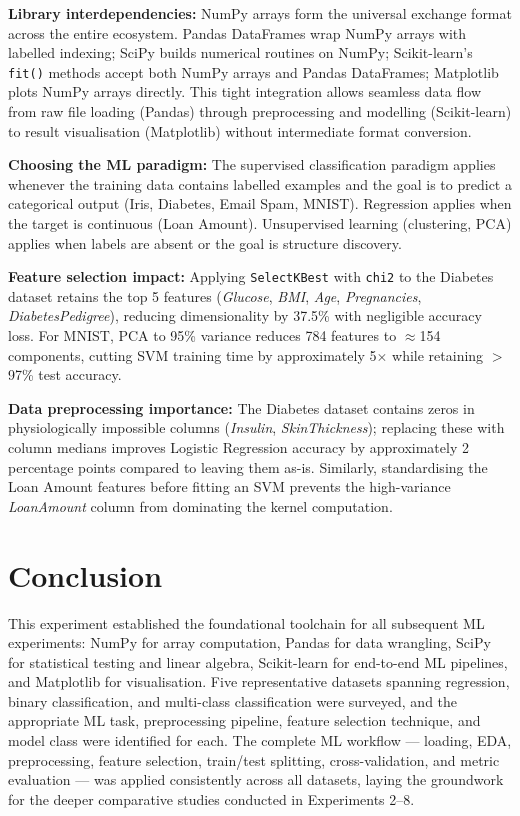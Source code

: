 \documentclass[12pt,a4paper]{article}
\begin{document}
\textbf{Library interdependencies:}
NumPy arrays form the universal exchange format across the entire ecosystem.
Pandas DataFrames wrap NumPy arrays with labelled indexing; SciPy builds numerical routines
on NumPy; Scikit-learn's \texttt{fit()} methods accept both NumPy arrays and Pandas DataFrames;
Matplotlib plots NumPy arrays directly. This tight integration allows seamless data flow
from raw file loading (Pandas) through preprocessing and modelling (Scikit-learn) to
result visualisation (Matplotlib) without intermediate format conversion.

\textbf{Choosing the ML paradigm:}
The supervised classification paradigm applies whenever the training data contains labelled
examples and the goal is to predict a categorical output (Iris, Diabetes, Email Spam, MNIST).
Regression applies when the target is continuous (Loan Amount). Unsupervised learning (clustering,
PCA) applies when labels are absent or the goal is structure discovery.

\textbf{Feature selection impact:}
Applying \texttt{SelectKBest} with \texttt{chi2} to the Diabetes dataset retains the top 5 features
(\textit{Glucose}, \textit{BMI}, \textit{Age}, \textit{Pregnancies}, \textit{DiabetesPedigree}),
reducing dimensionality by 37.5\% with negligible accuracy loss. For MNIST, PCA to 95\% variance
reduces 784 features to $\approx$154 components, cutting SVM training time by approximately 5$\times$
while retaining $>$97\% test accuracy.

\textbf{Data preprocessing importance:}
The Diabetes dataset contains zeros in physiologically impossible columns (\textit{Insulin},
\textit{SkinThickness}); replacing these with column medians improves Logistic Regression
accuracy by approximately 2 percentage points compared to leaving them as-is.
Similarly, standardising the Loan Amount features before fitting an SVM prevents the
high-variance \textit{LoanAmount} column from dominating the kernel computation.

\section{Conclusion}

This experiment established the foundational toolchain for all subsequent ML experiments:
NumPy for array computation, Pandas for data wrangling, SciPy for statistical testing and
linear algebra, Scikit-learn for end-to-end ML pipelines, and Matplotlib for visualisation.
Five representative datasets spanning regression, binary classification, and multi-class
classification were surveyed, and the appropriate ML task, preprocessing pipeline,
feature selection technique, and model class were identified for each.
The complete ML workflow --- loading, EDA, preprocessing, feature selection, train/test
splitting, cross-validation, and metric evaluation --- was applied consistently across all
datasets, laying the groundwork for the deeper comparative studies conducted in Experiments 2--8.
\end{document}
